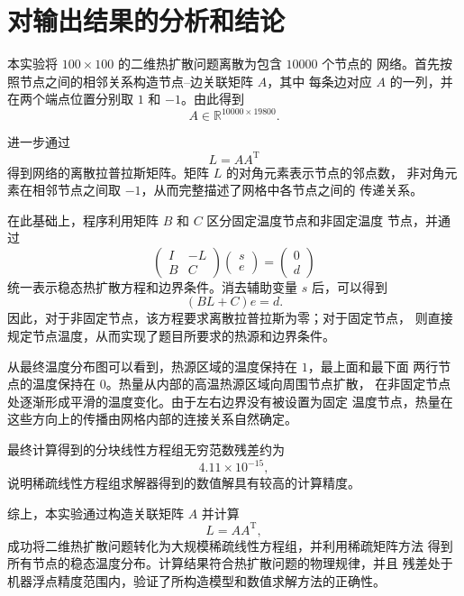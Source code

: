 \documentclass[UTF8,a4paper,11pt,fontset=fandol]{ctexart}
\begin{document}
\section{对输出结果的分析和结论}

本实验将 $100\times100$ 的二维热扩散问题离散为包含 $10000$ 个节点的
网络。首先按照节点之间的相邻关系构造节点--边关联矩阵 $A$，其中
每条边对应 $A$ 的一列，并在两个端点位置分别取 $1$ 和 $-1$。由此得到
\[
A\in\mathbb{R}^{10000\times19800}.
\]

进一步通过
\[
L=AA^{\mathrm T}
\]
得到网络的离散拉普拉斯矩阵。矩阵 $L$ 的对角元素表示节点的邻点数，
非对角元素在相邻节点之间取 $-1$，从而完整描述了网格中各节点之间的
传递关系。

在此基础上，程序利用矩阵 $B$ 和 $C$ 区分固定温度节点和非固定温度
节点，并通过
\[
\begin{pmatrix}
I&-L\\
B&C
\end{pmatrix}
\begin{pmatrix}
s\\e
\end{pmatrix}
=
\begin{pmatrix}
0\\d
\end{pmatrix}
\]
统一表示稳态热扩散方程和边界条件。消去辅助变量 $s$ 后，可以得到
\[
(BL+C)e=d.
\]
因此，对于非固定节点，该方程要求离散拉普拉斯为零；对于固定节点，
则直接规定节点温度，从而实现了题目所要求的热源和边界条件。

从最终温度分布图可以看到，热源区域的温度保持在 $1$，最上面和最下面
两行节点的温度保持在 $0$。热量从内部的高温热源区域向周围节点扩散，
在非固定节点处逐渐形成平滑的温度变化。由于左右边界没有被设置为固定
温度节点，热量在这些方向上的传播由网格内部的连接关系自然确定。

最终计算得到的分块线性方程组无穷范数残差约为
\[
4.11\times10^{-15},
\]
说明稀疏线性方程组求解器得到的数值解具有较高的计算精度。

综上，本实验通过构造关联矩阵 $A$ 并计算
\[
L=AA^{\mathrm T},
\]
成功将二维热扩散问题转化为大规模稀疏线性方程组，并利用稀疏矩阵方法
得到所有节点的稳态温度分布。计算结果符合热扩散问题的物理规律，并且
残差处于机器浮点精度范围内，验证了所构造模型和数值求解方法的正确性。
\end{document}
